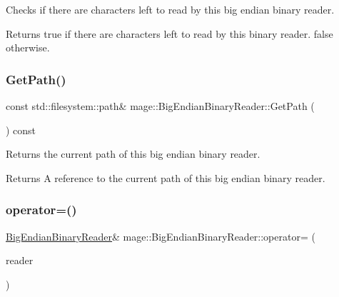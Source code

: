Checks if there are characters left to read by this big endian binary reader.

\begin{DoxyReturn}{Returns}
{\ttfamily true} if there are characters left to read by this binary reader. {\ttfamily false} otherwise. 
\end{DoxyReturn}
\mbox{\label{classmage_1_1_big_endian_binary_reader_a1d21e0117af4cbf99152e4a659372364}} 
\subsubsection{\texorpdfstring{Get\+Path()}{GetPath()}}
{\footnotesize\ttfamily const std\+::filesystem\+::path\& mage\+::\+Big\+Endian\+Binary\+Reader\+::\+Get\+Path (\begin{DoxyParamCaption}{ }\end{DoxyParamCaption}) const\hspace{0.3cm}{\ttfamily [noexcept]}}

Returns the current path of this big endian binary reader.

\begin{DoxyReturn}{Returns}
A reference to the current path of this big endian binary reader. 
\end{DoxyReturn}
\mbox{\label{classmage_1_1_big_endian_binary_reader_abd4b24df4219469a8c2e9253b1cad405}} 
\subsubsection{\texorpdfstring{operator=()}{operator=()}\hspace{0.1cm}{\footnotesize\ttfamily [1/2]}}
{\footnotesize\ttfamily \mbox{\hyperlink{classmage_1_1_big_endian_binary_reader}{Big\+Endian\+Binary\+Reader}}\& mage\+::\+Big\+Endian\+Binary\+Reader\+::operator= (\begin{DoxyParamCaption}\item[{const \mbox{\hyperlink{classmage_1_1_big_endian_binary_reader}{Big\+Endian\+Binary\+Reader}} \&}]{reader }\end{DoxyParamCaption})\hspace{0.3cm}{\ttfamily [delete]}}


